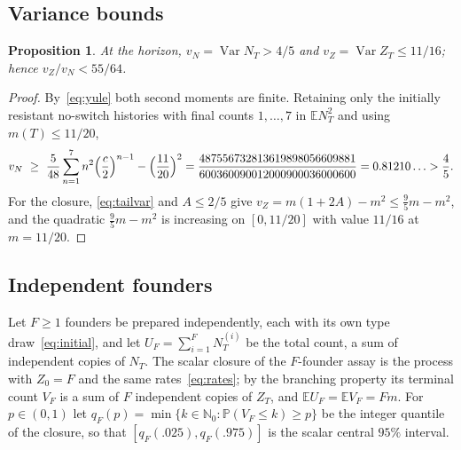 \documentclass[11pt,a4paper]{article}
\theoremstyle{plain}
\newtheorem{proposition}[theorem]{Proposition}
\theoremstyle{definition}
\theoremstyle{remark}
\newcommand{\N}{\mathbb N}
\newcommand{\PP}{\mathbb P}
\newcommand{\EE}{\mathbb E}
\newcommand{\Var}{\operatorname{Var}}
\begin{document}
\subsection{Variance bounds}
\begin{proposition}\label{prop:variance}
At the horizon, $v_N=\Var N_T>4/5$ and $v_Z=\Var Z_T\le11/16$; hence $v_Z/v_N<55/64$.
\end{proposition}
\begin{proof}
By~\eqref{eq:yule} both second moments are finite. Retaining only the initially resistant no-switch histories with final counts $1,\dots,7$ in $\EE N_T^2$ and using $m(T)\le11/20$,
\[
v_N\ \ge\ \frac5{48}\sum_{n=1}^{7}n^2\Bigl(\frac c2\Bigr)^{n-1}-\Bigl(\frac{11}{20}\Bigr)^2
=\frac{487556732813619898056609881}{600360090012000900036000600}=0.81210\ldots>\frac45 .
\]
For the closure, \eqref{eq:tailvar} and $A\le2/5$ give $v_Z=m(1+2A)-m^2\le\frac95m-m^2$, and the quadratic $\frac95m-m^2$ is increasing on $[0,11/20]$ with value $11/16$ at $m=11/20$.
\end{proof}

\subsection{Independent founders}
Let $F\ge1$ founders be prepared independently, each with its own type draw~\eqref{eq:initial}, and let $U_F=\sum_{i=1}^F N_T^{(i)}$ be the total count, a sum of independent copies of $N_T$. The scalar closure of the $F$-founder assay is the process with $Z_0=F$ and the same rates~\eqref{eq:rates}; by the branching property its terminal count $V_F$ is a sum of $F$ independent copies of $Z_T$, and $\EE U_F=\EE V_F=Fm$. For $p\in(0,1)$ let $q_F(p)=\min\{k\in\N_0:\PP(V_F\le k)\ge p\}$ be the integer quantile of the closure, so that $[q_F(.025),q_F(.975)]$ is the scalar central $95\%$ interval.
\end{document}
